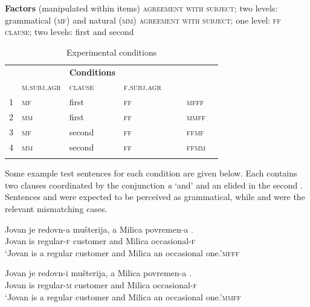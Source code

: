 \documentclass[output=paper,modfonts,newtxmath,hidelinks]{langscibook}
\begin{document}
 \ea \textbf{Factors} (manipulated within items)\label{14:ex9}
  			\ea \textsc{agreement with  subject}; two levels: grammatical (\textsc{mf}) and natural (\textsc{mm})\label{14:ex9a}
  			\ex \textsc{agreement with  subject}; one level: \textsc{ff} \label{14:ex9b}
  			\ex \textsc{clause}; two levels: first and second\label{14:ex9c}
            \z \z
 
\begin{table}[h]
  		\centering
  		\begin{tabularx}{0.8\textwidth}{llp{2cm}llll}
		\lsptoprule
  			\multicolumn{4}{c}{\textbf{Factors and levels}} & & \textbf{Conditions}\\
  			& \textsc{m.subj.agr}         & \textsc{clause} & \textsc{f.subj.agr}  &               & \\
			\midrule
  			1  & \textsc{mf}     & first  & \textsc{ff}          & ~~  & \textsc{mfff} \\
  			2  & \textsc{mm}     & first  & \textsc{ff}          &     & \textsc{mmff} \\	
  			3  & \textsc{mf}     & second & \textsc{ff}          &   & \textsc{ffmf} \\
  			4  & \textsc{mm}     & second & \textsc{ff}          &    &  \textsc{ffmm} \\\lspbottomrule
  		\end{tabularx}
  		\caption{\label{14:table:experimconditions}Experimental conditions}
  	\end{table}	

\noindent Some example test sentences for each condition are given below. Each contains two clauses coordinated by the conjunction \textit{a} `and' and an elided  in the second . Sentences  and  were expected to be perceived as grammatical, while  and  were the relevant mismatching cases.
 
 
\ea \gll Jovan je redovn{-a} mušterija, a Milica povremen{-a} \underline{\hspace{1.5cm}}.\\
  		Jovan is regular{-\textsc{f}} customer and Milica occasional{-\textsc{f}}\\
  		\glt `Jovan is a regular customer and Milica an occasional one.'\hfill \textsc{mfff}\label{14:ex10}
        \z
  		
  		\ea \gll Jovan je redovn{-i} mušterija, a Milica povremen{-a} \underline{\hspace{1.5cm}}.\\
  		Jovan is regular{-\textsc{m}} customer and Milica occasional{-\textsc{f}}\\
  		\glt `Jovan is a regular customer and Milica an occasional one.'\hfill  \textsc{mmff}\label{14:ex11}
        \z
 
\end{document}

